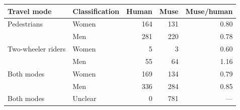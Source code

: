 \begin{tabular}{@{}llrrr@{}}
\toprule
Travel mode & Classification & Human & Muse & Muse/human \\
\midrule
Pedestrians & Women & 164 & 131 & 0.80 \\
 & Men & 281 & 220 & 0.78 \\
Two-wheeler riders & Women & 5 & 3 & 0.60 \\
 & Men & 55 & 64 & 1.16 \\
Both modes & Women & 169 & 134 & 0.79 \\
 & Men & 336 & 284 & 0.85 \\
Both modes & Unclear & 0 & 781 & --- \\
\bottomrule
\end{tabular}
